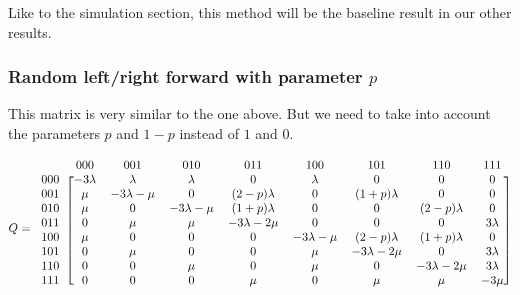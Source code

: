 \documentclass[10pt,a4paper]{article}
\begin{document}
Like to the simulation section, this method will be the baseline result in our other results.

\subsubsection*{Random left/right forward with parameter $p$}
This matrix is very similar to the one above. But we need to take into account the parameters $p$ and $1-p$ instead of $1$ and $0$.

\[ Q =
  \begin{blockarray}{ccccccccc}
    & 000 & 001 & 010 & 011 & 100 & 101 & 110 & 111 \\
    \begin{block}{c[cccccccc]}
    000 & -3 \lambda & \lambda & \lambda & 0 & \lambda & 0 & 0 & 0 \\
    001 & \mu & -3\lambda-\mu & 0 & (2-p)\lambda & 0 & (1+p)\lambda & 0 & 0 \\
    010 & \mu & 0 & -3\lambda-\mu & (1+p)\lambda & 0 & 0 & (2-p)\lambda & 0 \\
    011 & 0 & \mu & \mu & -3\lambda-2\mu & 0 & 0 & 0 & 3\lambda \\
    100 & \mu & 0 & 0 & 0 & -3\lambda-\mu & (2-p)\lambda & (1+p)\lambda & 0 \\
    101 & 0 & \mu & 0 & 0 & \mu & -3\lambda-2\mu & 0 & 3\lambda \\
    110 & 0 & 0 & \mu & 0 & \mu & 0 & -3\lambda-2\mu & 3\lambda \\
    111 & 0 & 0 & 0 & \mu & 0 & \mu & \mu & -3\mu \\
    \end{block}
  \end{blockarray}
\]
\end{document}
